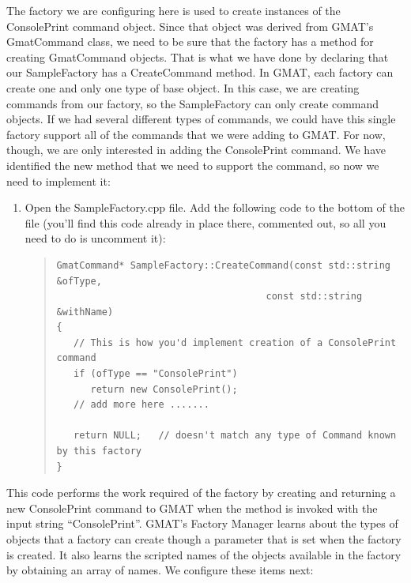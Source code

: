 \documentclass[10pt,letterpaper]{article}
\begin{document}
The factory we are configuring here is used to create instances of the ConsolePrint command object.  Since that object was derived from GMAT's GmatCommand class, we need to be sure that the factory has a method for creating GmatCommand objects.  That is what we have done by declaring that our SampleFactory has a CreateCommand method.  In GMAT, each factory can create one and only one type of base object.  In this case, we are creating commands from our factory, so the SampleFactory can only create command objects.  If we had several different types of commands, we could have this single factory support all of the commands that we were adding to GMAT.  For now, though, we are only interested in adding the ConsolePrint command.  We have identified the new method that we need to support the command, so now we need to implement it:

\begin{enumerate}
\setcounter{enumi}{\value{saveenum}}
\item Open the SampleFactory.cpp file.  Add the following code to the bottom of the file (you'll find this code already in place there, commented out, so all you need to do is uncomment it):
\begin{quote}
\begin{verbatim}
GmatCommand* SampleFactory::CreateCommand(const std::string &ofType,
                                     const std::string &withName)
{
   // This is how you'd implement creation of a ConsolePrint command 
   if (ofType == "ConsolePrint")
      return new ConsolePrint();
   // add more here .......

   return NULL;   // doesn't match any type of Command known by this factory
}
\end{verbatim}
\end{quote}
\setcounter{saveenum}{\value{enumi}}
\end{enumerate}

This code performs the work required of the factory by creating and returning a new ConsolePrint command to GMAT when the method is invoked with the input string ``ConsolePrint''.  GMAT's Factory Manager learns about the types of objects that a factory can create though a parameter that is set when the factory is created.  It also learns the scripted names of the objects available in the factory by obtaining an array of names.  We configure these items next:
\end{document}
